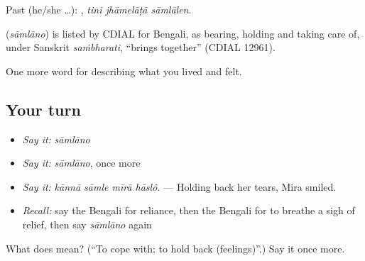 Past (he/she …):   , \emph{tini jhāmelāṭā sāmlālen}.

\begin{cousinweb}
\textbf{} (\emph{sāmlāno}) is listed by CDIAL for Bengali, as bearing, holding and taking care of, under Sanskrit \emph{saṁbharati}, \textquotedblleft{}brings together\textquotedblright{} (CDIAL 12961).
\end{cousinweb}

\begin{grammarlens}[title={What you've built}]
One more word for describing what you lived and felt.
\end{grammarlens}

\subsection*{Your turn}
\begin{itemize}
\raggedright
  \item \emph{Say it:} \emph{sāmlāno}
  \item \emph{Say it:} \emph{sāmlāno}, once more
  \item \emph{Say it:} \emph{kānnā sāmle mīrā hāslô.} — Holding back her tears, Mira smiled.
  \item \emph{Recall:} say the Bengali for reliance, then the Bengali for to breathe a sigh of relief, then say \emph{sāmlāno} again
\end{itemize}

\begin{tcolorbox}[breakable,colback=teal!4,colframe=teal!35!black,title={Before you move on}]
What does  mean? (\textquotedblleft{}To cope with; to hold back (feelings)\textquotedblright{}.) Say it once more.
\end{tcolorbox}
